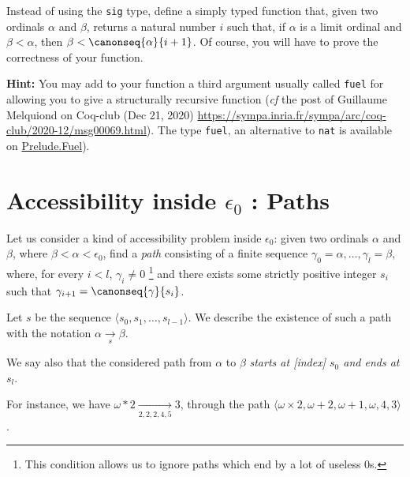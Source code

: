 
\begin{exercise}\label{exo:simply-typed-canonseq}
Instead of using the \texttt{sig} type, define a simply typed function that, given two ordinals $\alpha$ and $\beta$, returns a natural number $i$ such that, if $\alpha$ is a limit ordinal and $\beta<\alpha$, then $\beta< \canonseq{\alpha}{i+1}$. Of course, you will have to prove the correctness of your function. 

\textbf{Hint:} You may add to your function a third argument usually called \texttt{fuel} for allowing you to give a structurally 
recursive function (\emph{cf} the post of Guillaume Melquiond on Coq-club (Dec 21, 2020)
\url{https://sympa.inria.fr/sympa/arc/coq-club/2020-12/msg00069.html}).
The type \texttt{fuel}, an alternative 
to \texttt{nat} is available on \href{../theories/html/hydras.Prelude.Fuel.html}{Prelude.Fuel}).

\end{exercise}






\section{Accessibility inside \texorpdfstring{$\epsilon_0$}{epsilon0} : Paths}
\label{sect:pathes-intro}

Let us consider a kind of accessibility problem inside $\epsilon_0$: given two ordinals $\alpha$ and $\beta$, where $\beta<\alpha<\epsilon_0$, find a \emph{path} consisting of a finite sequence $\gamma_0=\alpha,\dots,\gamma_l=\beta$,
where, for every $i<l$, $\gamma_i \not= 0$ \footnote{This condition allows us to ignore paths which end by a lot of useless $0$s.} and there exists some strictly positive integer $s_i$
such that $\gamma_{i+1}=\canonseq{\gamma}{s_i}$.

Let $s$ be the sequence $\langle s_0,s_1,\dots, s_{l-1} \rangle$. We describe the
existence of such a path with the notation $\alpha\xrightarrow [s]{}\beta$.

We say also that the considered path from $\alpha$ to $\beta$ \emph{starts at [index] $s_0$ and ends at $s_l$}.

For instance, we have $\omega*2 \xrightarrow[2,2,2,4,5]{}3$, through the 
path $\langle\omega\times 2, \omega+2,\omega+1,\omega,4,3\rangle$.


